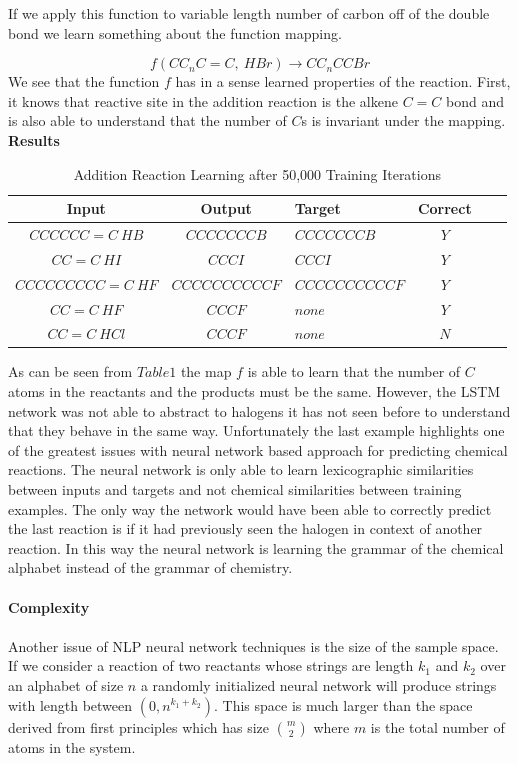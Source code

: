 \documentclass[aps,floatfix,prd,showpacs]{revtex4}
\begin{document}
If we apply this function to variable length number of carbon off of the double bond we learn something about the function mapping. 

$$ f(CC_nC=C , \ HBr )\rightarrow CC_nCCBr$$
We see that the function $f$ has in a sense learned properties of the reaction. First, it knows that reactive site in the addition reaction is the alkene $C=C$ bond and is also able to understand that the number of $C$s is invariant under the mapping. \\




 \textbf{Results}

\begin{table}[ht]
\caption{Addition Reaction Learning after 50,000 Training Iterations}
\label{Addition}
\begin{tabular}{cclccl}
\hline
Input & Output &  Target & Correct\\
\hline
\hline
$CCCCCC=C \ HB$ & $CCCCCCCB$ & $CCCCCCCB$ & $Y$ \\
$CC=C \ HI$ & $CCCI$ & $CCCI$& $Y$  \\
$CCCCCCCCC=C \ HF$ & $CCCCCCCCCCF$ & $CCCCCCCCCCF$& $Y$  \\
$CC=C \ HF$ & $CCCF$ & $none$& $Y$ \\
$CC=C \ HCl $ & $CCCF$ & $none$& $N$ \\

\hline
\hline
\end{tabular}
\end{table}
As can be seen from $Table 1$ the map $f$ is able to learn that the number of $C$ atoms in the reactants and the products must be the same. However, the LSTM network was not able to abstract to halogens it has not seen before to understand that they behave in the same way. Unfortunately the last example highlights one of the greatest issues with neural network based approach for predicting chemical reactions. The neural network is only able to learn lexicographic similarities between inputs and targets and not chemical  similarities between training examples. The only way the network would have been able to correctly predict the last reaction is if it had previously seen the halogen in context of another reaction. In this way the neural network is learning the grammar of the chemical alphabet instead of the grammar of chemistry.
\\
\\
\textbf{Complexity}
\\
\\
Another issue of NLP neural network techniques is the size of the sample space. If we consider a reaction of two reactants whose strings are length $k_1$ and $k_2$ over an alphabet of size $n$ a randomly initialized neural network will produce strings with length between $(0, n^{k_1 + k_2})$. This space is much larger than the space derived from first principles which has size $m \choose 2$ where $m$ is the total number of atoms in the system.
\end{document}
